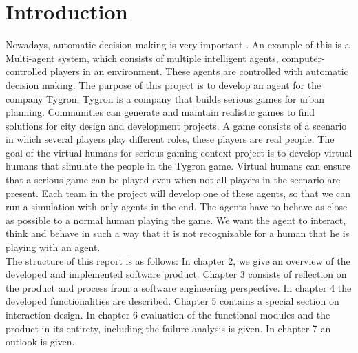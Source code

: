 \chapter{Introduction}
Nowadays, automatic decision making is very important \cite{Lizheng2010}. An example of this is a Multi-agent system, which consists of multiple intelligent agents, computer-controlled players in an environment. These agents are controlled with automatic decision making. The purpose of this project is to develop an agent for the company Tygron. Tygron is a company that builds serious games for urban planning. Communities can generate and maintain realistic games to find solutions for city design and development projects. A game consists of a scenario in which several players play different roles, these players are real people. The goal of the virtual humans for serious gaming context project is to develop virtual humans that simulate the people in the Tygron game. Virtual humans can ensure that a serious game can be played even when not all players in the scenario are present. Each team in the project will develop one of these agents, so that we can run a simulation with only agents in the end. The agents have to behave as close as possible to a normal human playing the game. We want the agent to interact, think and behave in such a way that it is not recognizable for a human that he is playing with an agent.\\

The structure of this report is as follows:
In chapter 2, we give an overview of the developed and implemented software product. Chapter 3 consists of reflection on the product and process from a software engineering perspective. In chapter 4 the developed functionalities are described. Chapter 5 contains a special section on interaction design. In chapter 6 evaluation of the functional modules and the product in its entirety, including the failure analysis is given. In chapter 7 an outlook is given.

